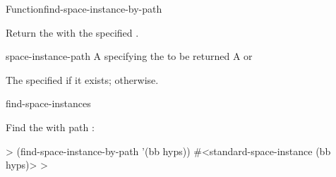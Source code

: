 \documentclass[10pt,twoside,english,pdftex]{article}
\begin{document}
\begin{functiondoc}{Function}{find-space-instance-by-path}%
  {
    \returns{} }

\fnsyntax

\fnpurpose Return the  with the specified
. 

\fnpackage {}

\fnmodule {}

\fnargs
\begin{args}{space-instance-path}
 A  specifying the
 to be returned 
 A  or \nil{}
\end{args}

\fnreturns The specified  if it exists; \nil{}
otherwise.

\begin{alsos}{find-space-instances}
\end{alsos}

\fnexample
Find the  with path :
%
\W\supp
\begin{example}
  > (find-space-instance-by-path '(bb hyps))
  #<standard-space-instance (bb hyps)>
  >
\end{example}

\end{functiondoc}

\end{document}
